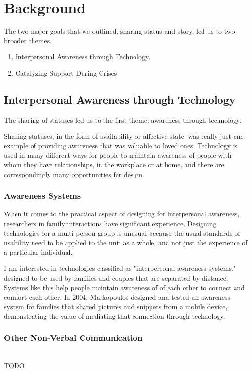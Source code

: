 \chapter{Background}
  The two major goals that we outlined,
  sharing status and story, led us to two broader themes.
  \begin{enumerate}
  \item Interpersonal Awareness through Technology.
  \item Catalyzing Support During Crises
  \end{enumerate}

\section{Interpersonal Awareness through Technology}
  The sharing of statuses led us to the first theme:
  awareness through technology.

  Sharing statuses,
  in the form of availability or affective state,
  was really just one example of providing awareness that was valuable to loved ones.
  Technology is used in many different ways for people to maintain
  awareness of people with whom they have relationships,
  in the workplace or at home,
  and there are correspondingly many opportunities for design.

  \subsection{Awareness Systems}
    When it comes to the practical aspect of designing for interpersonal
    awareness, researchers in family interactions have significant experience.
    Designing technologies for a multi-person group is unusual because the usual
    standards of usability need to be applied to the unit as a whole, and not just
    the experience of a particular individual. \cite{neustaedter12}

    I am interested in technologies classified as "interpersonal awareness systems,"
    designed to be used by families and couples that are separated by distance.
    Systems like this help people maintain awareness of  of each other to connect
    and comfort each other. \cite{neustaedter06}
    In 2004, Markopoulos designed and tested an
    awareness system for families that shared pictures and snippets from a mobile
    device, demonstrating the value of mediating that connection through technology.
    \cite{markopoulos04}

  \subsection{Other Non-Verbal Communication}
    \\TODO

